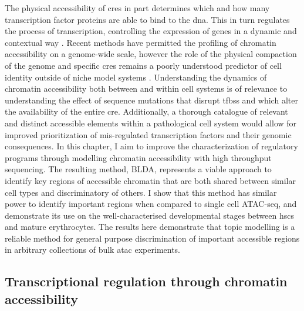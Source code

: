 The physical accessibility of \Glspl{cre} in part determines which and how many transcription factor proteins are able to bind to the \gls{dna}. This in turn regulates the process of transcription, controlling the expression of genes in a dynamic and contextual way \cite{Minnoye2021, Klemm}. Recent methods have permitted the profiling of chromatin accessibility on a genome-wide scale, however the role of the physical compaction of the genome and specific \glspl{cre} remains a poorly understood predictor of cell identity outside of niche model systems \cite{Schulz2019}. Understanding the dynamics of chromatin accessibility both between and within cell systems is of relevance to understanding the effect of sequence mutations that disrupt \glspl{tfbs} and which alter the availability of the entire \gls{cre}. Additionally, a thorough catalogue of relevant and distinct accessible elements within a pathological cell system would allow for improved prioritization of mis-regulated transcription factors and their genomic consequences. In this chapter, I aim to improve the characterization of regulatory programs through modelling chromatin accessibility with high throughput sequencing. The resulting method, BLDA, represents a viable approach to identify key regions of accessible chromatin that are both shared between similar cell types and discriminatory of others. I show that this method has similar power to identify important regions when compared to single cell ATAC-seq, and demonstrate its use on the well-characterised developmental stages between \glspl{hsc} and mature erythrocytes. The results here demonstrate that topic modelling is a reliable method for general purpose discrimination of important accessible regions in arbitrary collections of bulk \gls{atac} experiments.

\subsection{Transcriptional regulation through chromatin accessibility} \label{ch3:chrom_acc}

